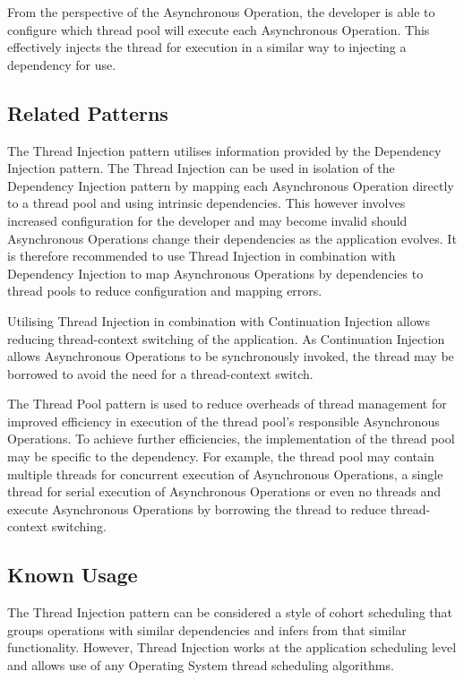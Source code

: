 \documentclass[prodmode]{style/acmlarge}
\begin{document}
From the perspective of the Asynchronous Operation, the developer is able to
configure which thread pool will execute each Asynchronous Operation.  This
effectively injects the thread for execution in a similar way to injecting a
dependency for use.


\subsection{Related Patterns}

The Thread Injection pattern utilises information provided by the Dependency
Injection pattern.  The Thread Injection can be used in isolation of the
Dependency Injection pattern by mapping each Asynchronous Operation directly to
a thread pool and using intrinsic dependencies.  This however involves increased
configuration for the developer and may become invalid should Asynchronous
Operations change their dependencies as the application evolves.  It is
therefore recommended to use Thread Injection in combination with Dependency
Injection to map Asynchronous Operations by dependencies to thread pools to
reduce configuration and mapping errors.

Utilising Thread Injection in combination with Continuation Injection allows
reducing thread-context switching of the application.  As Continuation Injection
allows Asynchronous Operations to be synchronously invoked, the thread may be
borrowed to avoid the need for a thread-context switch.

The Thread Pool pattern \cite{thread-per-request} is used to reduce overheads of
thread management for improved efficiency in execution of the thread pool's
responsible Asynchronous Operations.  To achieve further efficiencies, the
implementation of the thread pool may be specific to the dependency.  For
example, the thread pool may contain multiple threads for concurrent execution
of Asynchronous Operations, a single thread for serial execution of Asynchronous
Operations or even no threads and execute Asynchronous Operations by borrowing
the thread to reduce thread-context switching.


\subsection{Known Usage}

The Thread Injection pattern can be considered a style of cohort scheduling
\cite{cohort} that groups operations with similar dependencies and infers from
that similar functionality.  However, Thread Injection works at the application
scheduling level and allows use of any Operating System thread scheduling
algorithms.
\end{document}

